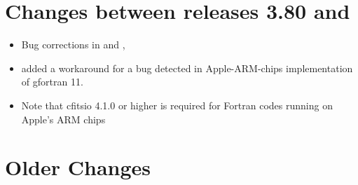 \documentclass[12pt,twoside]{article}
\begin{document}
\newpage

\section[Changes between releases 3.80 and \hpxversion]{Changes between releases 3.80 and \hpxversion} %
\begin{itemize}
\item Bug corrections in
   and
  ,
 \item added a workaround for a bug detected in Apple-ARM-chips implementation of gfortran 11.
 \item Note that cfitsio 4.1.0 or higher is required for Fortran codes running on Apple's ARM chips
\end{itemize}


\section[Older Changes]{Older Changes}
\end{document}
